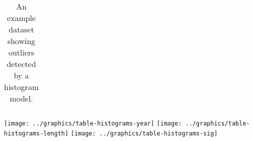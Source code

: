 \begin{table*}[t]
\begin{center}
\begin{tabular}{|c|c|c||c|c|c||c|c|c|}
\end{tabular}
\caption{An example dataset showing outliers detected by a histogram model.}
\label{tab:example}
\end{center}
\hspace{6.5cm} 
\texttt{[image: ../graphics/table-histograms-year]}
\hspace{2.8cm} 
\texttt{[image: ../graphics/table-histograms-length]}
\hspace{1.5cm} 
\texttt{[image: ../graphics/table-histograms-sig]}

\end{table*}
